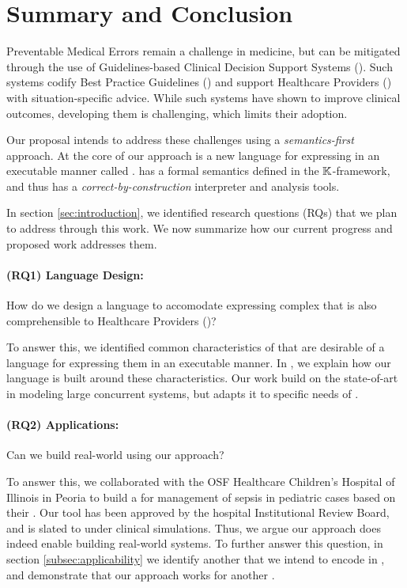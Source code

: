 \section{Summary and Conclusion}\label{sec:summary-and-conclusion}

Preventable Medical Errors remain a challenge in medicine, but
can be mitigated through the use of Guidelines-based Clinical Decision Support
Systems (\CDSSs{}). Such systems codify Best Practice Guidelines (\BPGs{}) and
support Healthcare Providers (\HCPs) with situation-specific advice.
While such systems have shown to improve clinical outcomes, developing
them is challenging, which limits their adoption.

Our proposal intends to address these challenges using a \emph{semantics-first}
approach. At the core of our approach is a new language for expressing
\BPGs{} in an executable manner called \MediK{}. \MediK{} has a formal semantics
defined in the $\mathbb{K}$-framework, and thus has a \emph{correct-by-construction}
interpreter and analysis tools.

In section \ref{sec:introduction}, we identified research questions (RQs)
that we plan to address through this work. We now summarize how our
current progress and proposed work addresses them.

\paragraph{(RQ1) Language Design:} How do we design a language to accomodate
expressing complex \BPGs{} that is also comprehensible to Healthcare Providers
(\HCPs{})?

To answer this, we identified common characteristics of \BPGs{} that are
desirable of a language for expressing them in an executable manner.
In \cite{SaxenaFMCAD23}, we explain how our language is built around
these characteristics. Our work build on the state-of-art in modeling
large concurrent systems, but adapts it to specific needs of \BPGs{}.

\paragraph{(RQ2) Applications:} Can we build real-world \CDSSs{} using our
approach?

To answer this, we collaborated with the OSF Healthcare Children's Hospital of Illinois
in Peoria to build a \CDSS{} for management of sepsis in pediatric
cases based on their \BPG{}. Our tool has been approved by the hospital
Institutional Review Board, and is slated to under clinical simulations.
Thus, we argue our approach does indeed enable building real-world systems.
To further answer this question, in section \ref{subsec:applicability} we
identify another \BPG{} that we intend to encode in \MediK{}, and demonstrate
that our approach works for another \BPG{}.

